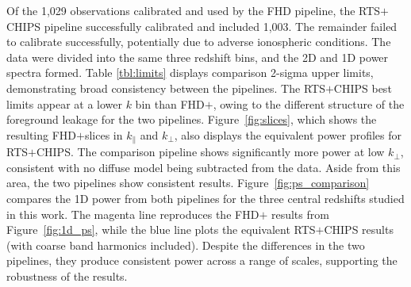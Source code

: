 \documentclass[iop]{emulateapj}
\begin{document}
Of the 1,029 observations calibrated and used by the FHD pipeline, the RTS$+$CHIPS 
pipeline successfully calibrated and included 1,003. The remainder failed to calibrate 
successfully, potentially due to adverse ionospheric conditions. The data were divided into the 
same three redshift bins, and the 2D and 1D power spectra formed. Table \ref{tbl:limits} 
displays comparison 2-sigma upper limits, demonstrating broad consistency between the 
pipelines. The RTS$+$CHIPS best limits appear at a lower $k$ bin than FHD$+$\eppsilon, 
owing to the different structure of the foreground leakage for the two pipelines. 
Figure~\ref{fig:slices}, which shows the resulting FHD$+$\eppsilon slices in $k_\parallel$ and 
$k_\bot$, also displays the equivalent power profiles for RTS$+$CHIPS. The comparison 
pipeline shows significantly more power at low $k_\bot$, consistent with no diffuse model 
being subtracted from the data. Aside from this area, the two pipelines show consistent 
results. Figure~\ref{fig:ps_comparison} compares the 1D power from both pipelines for the 
three central redshifts studied in this work. The magenta line reproduces the FHD$+$\eppsilon 
results from Figure~\ref{fig:1d_ps}, while the blue line plots the equivalent RTS$+$CHIPS 
results (with coarse band harmonics included). Despite the differences in the two pipelines, 
they produce consistent power across a range of scales, supporting the robustness of the 
results.

\end{document}
